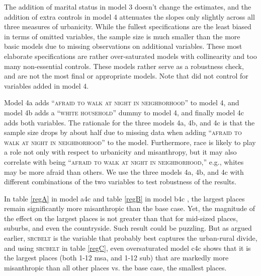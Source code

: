 \documentclass[11pt, letterpaper]{article}
\begin{document}
\begin{spacing}{1.4}
The addition of marital status in model 3 doesn't change the estimates, and the addition of extra controls in model 4 attenuates the slopes only slightly  across
all three measures of urbanicity.
{While the fullest specifications are the least biased in terms of omitted
variables, the sample size is much smaller than the more basic models due to
missing observations on additional variables. These most elaborate
specifications are rather over-saturated models with collinearity and 
too many non-essential controls. These models rather serve as a robustness check, and are not the most final or appropriate models. %
 Note that  \citet{wilson85} did not control for variables added in model 4.}


Model 4a adds ``\textsc{afraid to walk at night in neighborhood}'' to model 4,
and model 4b adds a ``\textsc{white household}'' dummy to model 4, and finally
model 4c adds both variables.  The rationale for the three models 4a, 4b, and 4c is
that the sample size drops by about half due to missing data when adding ``\textsc{afraid to walk at
  night in neighborhood}'' to the model. Furthermore, race is
likely to play a role not only with respect to urbanicity and misanthropy, but it
may also correlate with being ``\textsc{afraid to walk at night in
  neighborhood},'' e.g., whites may be more afraid than others. We use the three
models 4a, 4b, and 4c with different combinations of the two variables to test
robustness of the results. 
%

In table \ref{regA} in model a4c and table \ref{regB} in model b4c%
, the largest places
remain significantly more misanthropic than the base case. Yet, the magnitude of the effect on the largest places is not
greater than that for mid-sized places, suburbs, and even the countryside. Such
result could be puzzling.
 But as argued earlier, \textsc{srcbelt} is the variable that probably best
 captures the urban-rural divide, and using \textsc{srcbelt} in table
 \ref{regC}, even oversaturated 
 model c4c shows that it is the largest places (both 1-12 msa, and 1-12 sub) that are markedly more misanthropic than all other places vs. the base case, the smallest places.


\end{spacing}
\end{document}
